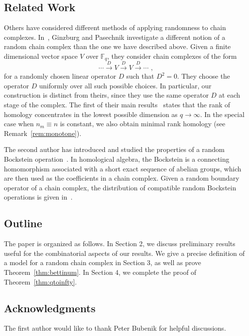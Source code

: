 \documentclass[3p,times]{elsarticle}
\theoremstyle{remark}
\newcommand\Fqn[1]{\mathbb{F}_q^{#1}}
\newcommand{\ra}{\rightarrow}
\newcommand{\lra}{\longrightarrow}
\begin{document}
\subsection*{Related Work} Others have considered different methods of applying
randomness to chain complexes. In~\cite{ginzburg2017random}, Ginzburg and
Pasechnik investigate a different notion of a random chain complex than the one
we have described above.  Given a finite dimensional vector space $V$ over
$\Fqn{}$, they consider chain complexes of the form \[ \cdots
\stackrel{D}{\lra} V \stackrel{D}{\lra} V \stackrel{D}{\lra} \cdots \, \, , \]
for a randomly chosen linear operator $D$ such that $D^2 = 0$. They choose the
operator $D$ uniformly over all such possible choices. In particular, our
construction is distinct from theirs, since they use the same operator $D$ at
each stage of the complex.
The first of their main results~\cite[Thm 2.1]{ginzburg2017random} states that
the rank of homology concentrates in the lowest possible dimension as $q \ra \infty$.  
In the special case when $n_m \equiv n$ is constant, we also obtain minimal rank
homology (see Remark~\ref{rem:monotone}).

The second author has introduced and studied the
properties of a random Bockstein operation~\cite{zabka2018random}. 
In homological algebra,
the Bockstein is a connecting homomorphism associated with a short exact
sequence of abelian groups, which are then used as the coefficients in a chain
complex. Given a random boundary operator of a chain complex, the distribution of compatible
random Bockstein operations is given in~\cite[Thm 5.2]{zabka2018random}.

\subsection*{Outline}
  The paper is organized as follows. In Section 2, we discuss preliminary results useful for 
  the combinatorial aspects of our results. We give a precise definition of a model for a 
  random chain complex in Section 3, as well as prove
  Theorem~\ref{thm:bettinum}. In Section 4, we complete the proof of Theorem~\ref{thm:qtoinfty}.

  \subsection*{Acknowledgments} The first author would like to thank Peter Bubenik for helpful discussions.

\end{document}
